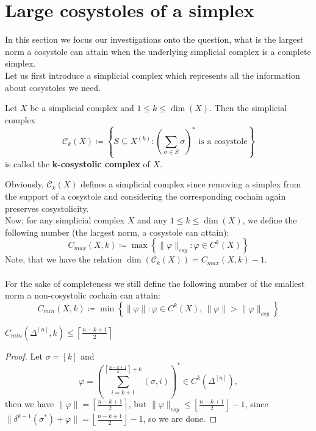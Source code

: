 \section{Large cosystoles of a simplex}

In this section we focus our investigations onto the question, what is the largest norm a cosystole can attain when the underlying simplicial complex is a complete simplex.\\
Let us first introduce a simplicial complex which represents all the information about cosystoles we need.

\begin{defi}
Let \(X\) be a simplicial complex and \(1\leq k\leq \dim(X)\). Then the simplicial complex
\[
\mathcal{C}_k(X)\coloneqq \left\{S\subseteq X^{(k)}:\left(\sum\limits_{\sigma\in S}\sigma\right)^*\text{ is a cosystole}\right\}
\]
is called the \textbf{k-cosystolic complex} of \(X\).
\end{defi}

Obviously, \(\mathcal{C}_k(X)\) defines a simplicial complex since removing a simplex from the support of a cosystole and considering the corresponding cochain again preserves cosystolicity.\\
Now, for any simplicial complex \(X\) and any \(1\leq k\leq \dim(X)\), we define the following number (the largest norm, a cosystole can attain):
\[
C_{max}(X,k)\coloneqq \max\left\{\|\varphi\|_{csy}:\varphi\in C^k(X)\right\}
\]
Note, that we have the relation \(\dim(\mathcal{C}_k(X))=C_{max}(X,k)-1\).\\
\\
For the sake of completeness we still define the following number of the smallest norm a non-cosystolic cochain can attain:
\[
C_{min}(X,k)\coloneqq \min\left\{\|\varphi\|:\varphi\in C^k(X)\text{, }\|\varphi\|>\|\varphi\|_{csy}\right\}
\]

\begin{prop}\label{proposition231}
\(C_{min}(\Delta^{[n]},k)\leq\left\lceil\frac{n-k+1}{2}\right\rceil\)
\begin{proof}
Let \(\sigma=[k]\) and
\[
\varphi=\left(\sum\limits_{i=k+1}^{\left\lceil\frac{n-k+1}{2}\right\rceil+k}(\sigma,i)\right)^*\in C^k(\Delta^{[n]}),
\]
then we have \(\|\varphi\|=\left\lceil\frac{n-k+1}{2}\right\rceil\), but \(\|\varphi\|_{csy}\leq\left\lfloor\frac{n-k+1}{2}\right\rfloor-1\), since\\
\(\|\delta^{k-1}(\sigma^*)+\varphi\|=\left\lfloor\frac{n-k+1}{2}\right\rfloor-1\), so we are done.
\end{proof}
\end{prop}


